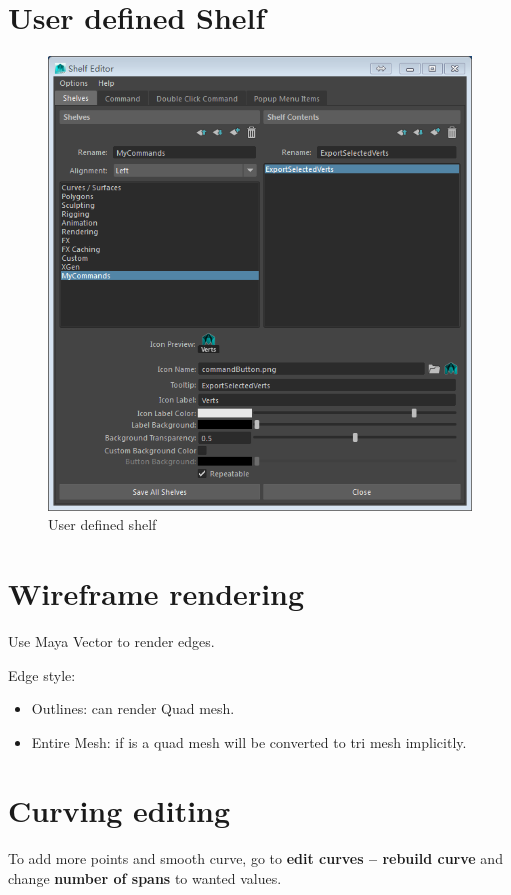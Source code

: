 \section{User defined Shelf}
\begin{figure}[h!]
	\centering
	\includegraphics[width=0.7\linewidth]{"figures/User-defined shelf"}
	\caption{User defined shelf}
	\label{fig:user-defined-shelf}
\end{figure}

\section{Wireframe rendering}
Use Maya Vector to render edges.

Edge style:
\begin{itemize}
	\item Outlines: can render Quad mesh.
	\item Entire Mesh: if is a quad mesh will be converted to tri mesh implicitly.
\end{itemize}

\section{Curving editing}
To add more points and smooth curve, go to \textbf{edit curves -- rebuild curve} and change \textbf{number of spans} to wanted values.

